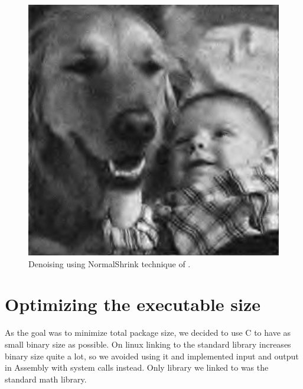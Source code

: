 \documentclass{article}
\begin{document}
\begin{figure}
	\centering
	\includegraphics[scale=0.4]{kd_normalshrink}
	\caption{Denoising using NormalShrink technique of \cite{ksc02}.}\label{fig:normalsht}
\end{figure}

\section{Optimizing the executable size}

As the goal was to minimize total package size, we decided to use C to have as small binary size as possible.
On linux linking to the standard library increases binary size quite a lot,
so we avoided using it and implemented input and output in Assembly with system calls instead.
Only library we linked to was the standard math library.






\end{document}
